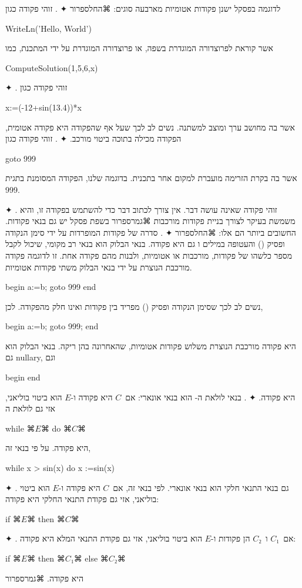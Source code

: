 \begin{Example}
  לדוגמה בפסקל ישנן פקודות אטומיות מארבעה סוגים:
  ⌘החל{ספרור}
    ✦ . זוהי פקודה כגון
    \begin{PASCAL}
WriteLn('Hello, World')
\end{PASCAL}
    אשר קוראת לפרוצדורה המוגדרת בשפה, או פרוצדורה המוגדרת על ידי המתכנת, כמו
    \begin{PASCAL}
ComputeSolution(1,5,6,x)
\end{PASCAL}
    ✦ . זוהי פקודה כגון
    \begin{PASCAL}
x:=(-12+sin(13.4))*x
\end{PASCAL}
    אשר בה מחושב ערך ומוצב למשתנה. נשים לב לכך שעל אף שהפקודה
    היא פקודה אטומית, הפקודה מכילה בתוכה ביטוי מורכב.
    ✦ . זוהי פקודה כגון
    \begin{PASCAL}
goto 999
\end{PASCAL}
    אשר בה בקרת הזרימה מועברת למקום אחר בתכנית. בדוגמה שלנו, הפקודה המסומנת בתגית 999.

    ✦ . זוהי פקודה שאינה עושה דבר. אין צורך לכתוב דבר כדי להשתמש בפקודה זו, והיא משמשת בעיקר לצורך בניית פקודות מורכבות
  ⌘גמר{ספרור}
  בשפת פסקל יש גם בנאי פקודות. החשובים ביותר הם אלו:
  ⌘החל{ספרור}
    ✦ . סדרה של פקודות המופרדות על ידי סימן הנקודה ופסיק ()
    והעטופה במילים  ו גם היא פקודה. בנאי הבלוק הוא בנאי רב מקומי, שיכול לקבל מספר כלשהו של פקודות, מורכבות או אטומיות, ולבנות מהם פקודה אחת. זו לדוגמה פקודה מורכבת הנוצרת על ידי בנאי
    הבלוק משתי פקודות אטומיות.
    \begin{PASCAL}
begin
  a:=b;
  goto 999
end
\end{PASCAL}
    נשים לב לכך שסימן הנקודה ופסיק () מפריד בין פקודות ואינו חלק מהפקודה.
    לכן,
    \begin{PASCAL}
begin
  a:=b;
  goto 999;
end
\end{PASCAL}
    היא פקודה מורכבת הנוצרת משלוש פקודות אטומיות, שהאחרונה בהן ריקה. בנאי הבלוק הוא גם nullary, וגם
    \begin{PASCAL}
begin
end
\end{PASCAL}
    היא פקודה.
    ✦ . בנאי לולאת ה- הוא בנאי אונארי: אם~$C$ היא פקודה ו-$E$ הוא ביטוי בוליאני, אזי גם לולאת ה
    \begin{PASCAL}
while ⌘$E$⌘ do ⌘$C$⌘
\end{PASCAL}
    היא פקודה. על פי בנאי זה,
    \begin{PASCAL}
while x > sin(x) do x :=sin(x)
\end{PASCAL}
    ✦ . גם בנאי התנאי חלקי הוא בנאי אונארי. לפי בנאי זה, אם~$C$ היא פקודה ו-$E$ הוא ביטוי בוליאני, אזי גם פקודת התנאי החלקי היא פקודה:
    \begin{PASCAL}
if ⌘$E$⌘ then ⌘$C$⌘
\end{PASCAL}
    ✦ . אם~$C₁$ ו~$C₂$ הן פקודות ו-$E$ הוא ביטוי בוליאני, אזי
    גם פקודת התנאי המלא היא פקודה:
    \begin{PASCAL}
if ⌘$E$⌘ then ⌘$C₁$⌘ else ⌘$C₂$⌘
\end{PASCAL}
    היא פקודה.
  ⌘גמר{ספרור}
\end{Example}

